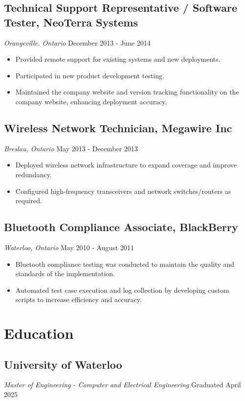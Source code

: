\documentclass[a4paper,11pt]{article}  %
\begin{document}
\subsection*{Technical Support Representative / Software Tester, NeoTerra Systems}
\textit{Orangeville, Ontario} \hfill December 2013 - June 2014
\begin{itemize}
    \item Provided remote support for existing systems and new deployments.
    \item Participated in new product development testing.  
    \item Maintained the company website and version tracking functionality on the company website, enhancing deployment accuracy.
\end{itemize}

\subsection*{Wireless Network Technician, Megawire Inc}
\textit{Breslau, Ontario} \hfill May 2013 - December 2013
\begin{itemize}
    \item Deployed wireless network infrastructure to expand coverage and improve redundancy. 
    \item Configured high-frequency transceivers and network switches/routers as required.
\end{itemize}

\subsection*{Bluetooth Compliance Associate, BlackBerry}
\textit{Waterloo, Ontario} \hfill May 2010 - August 2011
\begin{itemize}
    \item Bluetooth compliance testing was conducted to maintain the quality and standards of the implementation.
    \item Automated test case execution and log collection by developing custom scripts to increase efficiency and accuracy.
\end{itemize}

\section{Education}

\subsection*{University of Waterloo}
\textit{Master of Engineering - Computer and Electrical Engineering} \hfill Graduated April 2025
\end{document}

